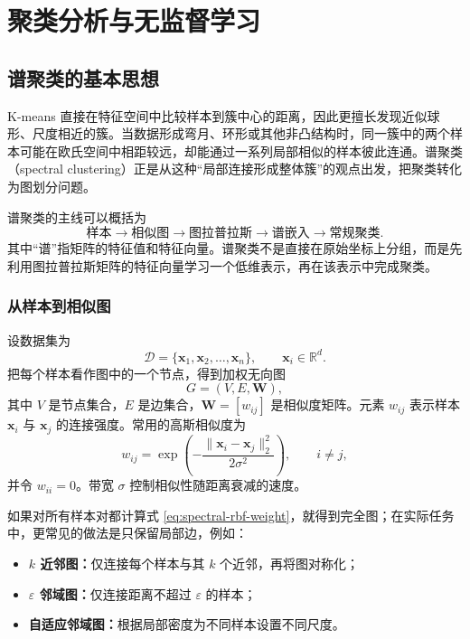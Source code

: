 \documentclass[UTF8,zihao=-4,openany]{ctexbook}
\begin{document}
\setcounter{chapter}{11}
\chapter{聚类分析与无监督学习}
\setcounter{section}{5}

\section{谱聚类的基本思想}

K-means 直接在特征空间中比较样本到簇中心的距离，因此更擅长发现近似球形、尺度相近的簇。当数据形成弯月、环形或其他非凸结构时，同一簇中的两个样本可能在欧氏空间中相距较远，却能通过一系列局部相似的样本彼此连通。谱聚类（spectral clustering）正是从这种“局部连接形成整体簇”的观点出发，把聚类转化为图划分问题。

谱聚类的主线可以概括为
\[
  \boxed{
  \text{样本}
  \longrightarrow
  \text{相似图}
  \longrightarrow
  \text{图拉普拉斯}
  \longrightarrow
  \text{谱嵌入}
  \longrightarrow
  \text{常规聚类}
  }.
\]
其中“谱”指矩阵的特征值和特征向量。谱聚类不是直接在原始坐标上分组，而是先利用图拉普拉斯矩阵的特征向量学习一个低维表示，再在该表示中完成聚类。

\subsection{从样本到相似图}

设数据集为
\[
  \mathcal D=\{\boldsymbol{x}_1,\boldsymbol{x}_2,\ldots,\boldsymbol{x}_n\},
  \qquad
  \boldsymbol{x}_i\in\mathbb R^d.
\]
把每个样本看作图中的一个节点，得到加权无向图
\[
  G=(V,E,\boldsymbol W),
\]
其中 \(V\) 是节点集合，\(E\) 是边集合，\(\boldsymbol W=[w_{ij}]\) 是相似度矩阵。元素 \(w_{ij}\) 表示样本 \(\boldsymbol{x}_i\) 与 \(\boldsymbol{x}_j\) 的连接强度。常用的高斯相似度为
\begin{equation}
  w_{ij}
  =
  \exp\left(
  -\frac{\|\boldsymbol{x}_i-\boldsymbol{x}_j\|_2^2}{2\sigma^2}
  \right),
  \qquad i\neq j,
  \label{eq:spectral-rbf-weight}
\end{equation}
并令 \(w_{ii}=0\)。带宽 \(\sigma\) 控制相似性随距离衰减的速度。

如果对所有样本对都计算式 \eqref{eq:spectral-rbf-weight}，就得到完全图；在实际任务中，更常见的做法是只保留局部边，例如：

\begin{itemize}
  \item \textbf{\(k\) 近邻图：}仅连接每个样本与其 \(k\) 个近邻，再将图对称化；
  \item \textbf{\(\varepsilon\) 邻域图：}仅连接距离不超过 \(\varepsilon\) 的样本；
  \item \textbf{自适应邻域图：}根据局部密度为不同样本设置不同尺度。
\end{itemize}
\end{document}
